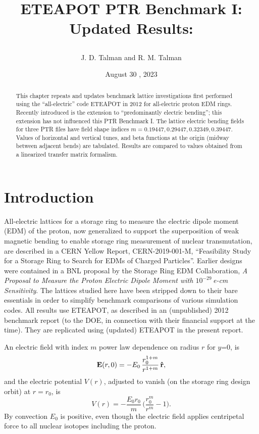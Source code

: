 \documentclass[12pt]{article}
\begin{document}
\date{August 30 , 2023}

\title{
\centerline{}
\centerline{}
\centerline{}
ETEAPOT PTR Benchmark I: Updated Results:
}
\author{J. D. Talman and R. M. Talman
}

\maketitle


\begin{abstract}
This chapter repeats and updates benchmark lattice investigations first performed 
using the ``all-electric'' code ETEAPOT in 2012 for all-electric proton EDM rings. 
Recently introduced is the extension to ``predominantly electric bending''; this extension
has not influenced this PTR Benchmark I.  The lattice electric bending fields for three PTR 
files have field shape indices $m=0.19447, 0.29447, 0.32349, 0.39447$.  Values of horizontal and vertical 
tunes, and beta functions at the origin (midway between adjacent bends) are tabulated. 
Results are compared to values obtained from a linearized transfer matrix formalism.
\end{abstract}
%

\clearpage

\section{Introduction}
All-electric lattices for a storage ring to measure the electric dipole moment (EDM) of the proton, 
now generalized to support the superposition of weak magnetic bending to enable storage ring 
measurement of nuclear transmutation, are described in a CERN Yellow Report, CERN-2019-001-M, 
``Feasibility Study for a Storage Ring to Search for EDMs of Charged Particles''.  Earlier designs 
were contained in a BNL proposal by the Storage Ring EDM Collaboration, 
\emph{A Proposal to Measure the Proton Electric Dipole Moment with $10^{-29}\,$e-cm Sensitivity}\cite{pEDM}.  
The lattices studied here have been stripped down to their bare essentials in order to simplify benchmark 
comparisons of various simulation codes. All results use ETEAPOT, as described in an (unpublished) 2012 
benchmark report (to the DOE, in connection with their financial support at the time).  They are replicated 
using (updated) ETEAPOT in the present report. 

An electric field with index $m$ power law dependence on radius $r$ for $y$=0, is
%
\begin{equation}
{\bf E}(r,0)
 = 
-E_0\,\frac{r_0^{1+ m }}{r^{1+ m }}\,{\bf\hat r},
\label{eq:WeakFoc.1m}
\end{equation}
%
and the electric potential $V(r)$, adjusted to vanish (on the storage ring 
design orbit) at $r=r_0$, is 
%
\begin{equation}
V(r)
 =
-\frac{E_0r_0}{ m }\,
\bigg(
\frac{r_0^m }{r^m }
 -
1
\bigg).
\label{eq:WeakFoc.2m}
\end{equation}
%
By convection $E_0$ is positive, even though the electric field applies centripetal force
to all nuclear isotopes including the proton.
\end{document}
